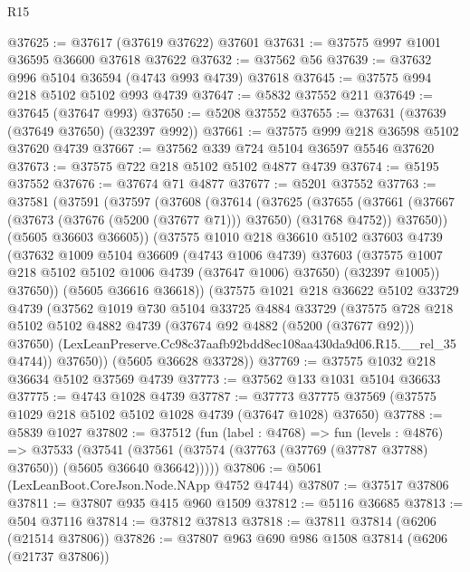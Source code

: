 \begin{lexlean}{R15}
\begin{coremodule}
{{{{{{{{{{{@37625 := @37617 (@37619 @37622) @37601
@37631 := @37575 @997 @1001 @36595 @36600 @37618 @37622
@37632 := @37562 @56
@37639 := @37632 @996 @5104 @36594 (@4743 @993 @4739) @37618
@37645 := @37575 @994 @218 @5102 @5102 @993 @4739
@37647 := @5832 @37552 @211
@37649 := @37645 (@37647 @993)
@37650 := @5208 @37552
@37655 := @37631 (@37639 (@37649 @37650) (@32397 @992))
@37661 := @37575 @999 @218 @36598 @5102 @37620 @4739
@37667 := @37562 @339 @724 @5104 @36597 @5546 @37620
@37673 := @37575 @722 @218 @5102 @5102 @4877 @4739
@37674 := @5195 @37552
@37676 := @37674 @71 @4877
@37677 := @5201 @37552
@37763 := @37581
    (@37591
      (@37597
        (@37608
          (@37614
            (@37625
              (@37655
                (@37661
                  (@37667 (@37673 (@37676 (@5200 (@37677 @71))) @37650) (@31768 @4752))
                  @37650))
              (@5605 @36603 @36605))
            (@37575
              @1010
              @218
              @36610
              @5102
              @37603
              @4739
              (@37632
                @1009
                @5104
                @36609
                (@4743 @1006 @4739)
                @37603
                (@37575 @1007 @218 @5102 @5102 @1006 @4739 (@37647 @1006) @37650)
                (@32397 @1005))
              @37650))
          (@5605 @36616 @36618))
        (@37575
          @1021
          @218
          @36622
          @5102
          @33729
          @4739
          (@37562
            @1019
            @730
            @5104
            @33725
            @4884
            @33729
            (@37575
              @728
              @218
              @5102
              @5102
              @4882
              @4739
              (@37674 @92 @4882 (@5200 (@37677 @92)))
              @37650)
            (LexLeanPreserve.Cc98c37aafb92bdd8ec108aa430da9d06.R15.__rel_35 @4744))
          @37650))
      (@5605 @36628 @33728))
@37769 := @37575 @1032 @218 @36634 @5102 @37569 @4739
@37773 := @37562 @133 @1031 @5104 @36633
@37775 := @4743 @1028 @4739
@37787 := @37773 @37775 @37569 (@37575 @1029 @218 @5102 @5102 @1028 @4739 (@37647 @1028) @37650)
@37788 := @5839 @1027
@37802 := @37512
    (fun (label : @4768) =>
    fun (levels : @4876) =>
    @37533
      (@37541 (@37561 (@37574 (@37763 (@37769 (@37787 @37788) @37650)) (@5605 @36640 @36642)))))
@37806 := @5061 (LexLeanBoot.CoreJson.Node.NApp @4752 @4744)
@37807 := @37517 @37806
@37811 := @37807 @935 @415 @960 @1509
@37812 := @5116 @36685
@37813 := @504 @37116
@37814 := @37812 @37813
@37818 := @37811 @37814 (@6206 (@21514 @37806))
@37826 := @37807 @963 @690 @986 @1508 @37814 (@6206 (@21737 @37806))
}}}}}}}}}}}
\end{coremodule}
\end{lexlean}
